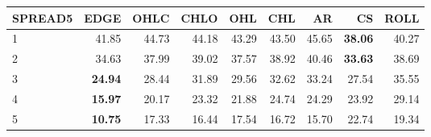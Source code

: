 \begin{table}[ht]
\centering
\begin{tabular}{lrrrrrrrr}
  \hline
SPREAD5 & EDGE & OHLC & CHLO & OHL & CHL & AR & CS & ROLL \\ 
  \hline
1 & 41.85 & 44.73 & 44.18 & 43.29 & 43.50 & 45.65 & \textbf{38.06} & 40.27 \\ 
  2 & 34.63 & 37.99 & 39.02 & 37.57 & 38.92 & 40.46 & \textbf{33.63} & 38.69 \\ 
  3 & \textbf{24.94} & 28.44 & 31.89 & 29.56 & 32.62 & 33.24 & 27.54 & 35.55 \\ 
  4 & \textbf{15.97} & 20.17 & 23.32 & 21.88 & 24.74 & 24.29 & 23.92 & 29.14 \\ 
  5 & \textbf{10.75} & 17.33 & 16.44 & 17.54 & 16.72 & 15.70 & 22.74 & 19.34 \\ 
   \hline
\end{tabular}
\end{table}
